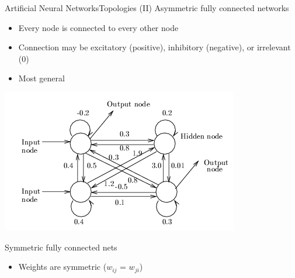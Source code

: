 \documentclass[10pt,compress]{beamer} %
\begin{document}
\begin{frame}{Artificial Neural Networks}{Topologies (II)}
	Asymmetric fully connected networks
		\begin{itemize}
		\item Every node is connected to every other node
		\item Connection may be excitatory (positive), inhibitory (negative), or irrelevant (0)
		\item Most general
		\end{itemize}
		\vspace{-0.7cm}
		\begin{center}
	\includegraphics[width=0.5\linewidth]{figs/connected.png}
	\end{center}
		\vspace{-0.5cm}
	Symmetric fully connected nets
		\begin{itemize}
		\item Weights are symmetric ($w_{ij}$ = $w_{ji}$)
		\end{itemize}
\end{frame}
\end{document}

